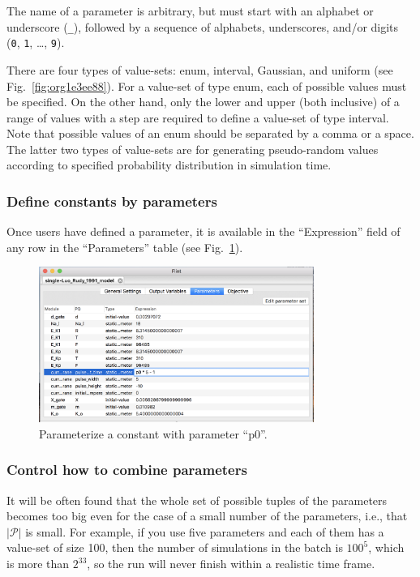 \documentclass[a4paper,10pt]{report}
\begin{document}
The name of a parameter is arbitrary, but must start with an alphabet or
underscore (\texttt{\_}), followed by a sequence of alphabets, underscores, and/or
digits (\texttt{0}, \texttt{1}, \ldots{}, \texttt{9}).

There are four types of value-sets: enum, interval, Gaussian, and uniform
(see Fig.~\ref{fig:org1e3ee88}).
For a value-set of type enum, each of possible values must be specified.
On the other hand, only the lower and upper (both inclusive) of a range
of values with a step are required to define a value-set of type interval.
Note that possible values of an enum should be separated by a comma or a space.
The latter two types of value-sets are for generating pseudo-random values
according to specified probability distribution in simulation time.

\subsubsection{Define constants by parameters}
\label{sec:orgb50aff5}
Once users have defined a parameter, it is available in the ``Expression'' field
of any row in the ``Parameters'' table (see Fig.~\ref{fig:org54eedab}).

\begin{figure}[htbp]
\centering
\includegraphics[width=0.8\textwidth]{image/lr-parameter-set.png}
\caption{\label{fig:org54eedab}Parameterize a constant with parameter ``p0''.}
\end{figure}

\subsubsection{\label{org3111fd7}Control how to combine parameters}
\label{sec:orgeb9201d}
It will be often found that the whole set of possible tuples of the parameters
becomes too big even for the case of a small number of the parameters, i.e., that
\(\lvert \mathcal{P} \rvert\) is small. For example, if you use five parameters
and each of them has a value-set of size 100, then the number of simulations
in the batch is \(100^5\), which is more than \(2^{33}\), so the run will never finish
within a realistic time frame.
\end{document}
